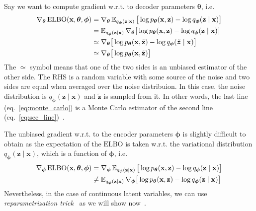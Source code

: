 Say we want to compute gradient w.r.t. to decoder parameters ${\boldsymbol{\theta}}$, i.e. 
\begin{align}
    \nabla_{{\boldsymbol{\theta}}}\,\mathrm{ELBO}(\mathbf{x},{\boldsymbol{\theta}},{\boldsymbol{\phi}}) &= \nabla_{{\boldsymbol{\theta}}} \operatorname{\mathbb{E}}_{q_{\boldsymbol{\phi}}(\mathbf{z}\mid\mathbf{x})} \big[\log p_{\boldsymbol{\theta}}(\mathbf{x},\mathbf{z}) - \log q_{\boldsymbol{\phi}}(\mathbf{z}\mid\mathbf{x})\big] \notag \\
        &= \operatorname{\mathbb{E}}_{q_{\boldsymbol{\phi}}(\mathbf{z}\mid\mathbf{x})} \nabla_{{\boldsymbol{\theta}}} \big[\log p_{\boldsymbol{\theta}}(\mathbf{x},\mathbf{z}) - \log q_{\boldsymbol{\phi}}(\mathbf{z}\mid\mathbf{x})\big] \label{eq:sec_line} \\
        &\simeq  \nabla_{{\boldsymbol{\theta}}} \big[\log p_{\boldsymbol{\theta}}(\mathbf{x},\tilde{\mathbf{z}}) - \log q_{\boldsymbol{\phi}}(\boldsymbol{\tilde{z}}\mid\mathbf{x})\big] \notag\\
        &\simeq \nabla_{{\boldsymbol{\theta}}} \big[\log p_{\boldsymbol{\theta}}(\mathbf{x},\tilde{\mathbf{z}})\big] \label{eq:monte_carlo}
\end{align}
The $\simeq$ symbol means that one of the two sides is an unbiased estimator of the other side. The RHS is a random variable with some source of the noise and two sides are equal
when averaged over the noise distribuion. In this case, the noise distribution is $q_{\boldsymbol{\phi}}(\mathbf{z}\mid \mathbf{x})$ and $\tilde{\mathbf{z}}$ is sampled from it. In other words, the last 
line (eq.~\ref{eq:monte_carlo}) is a Monte Carlo estimator of the second line (eq.~\ref{eq:sec_line})~\cite{intro-vae-2019}.

The unbiased gradient w.r.t. to the encoder parameters ${\boldsymbol{\phi}}$ is slightly difficult to obtain as the expectation of the $\mathrm{ELBO}$ is taken w.r.t. the variational distribution 
$q_{\boldsymbol{\phi}}(\mathbf{z}\mid \mathbf{x})$, which is a function of ${\boldsymbol{\phi}}$, i.e.
\begin{align}
    \nabla_{{\boldsymbol{\phi}}}\,\mathrm{ELBO}(\mathbf{x},{\boldsymbol{\theta}},{\boldsymbol{\phi}}) &= \nabla_{{\boldsymbol{\phi}}} \operatorname{\mathbb{E}}_{q_{\boldsymbol{\phi}}(\mathbf{z}\mid \mathbf{x})} \big[\log p_{\boldsymbol{\theta}}(\mathbf{x},\mathbf{z}) - \log q_{\boldsymbol{\phi}}(\mathbf{z}\mid \mathbf{x})\big] \\
                                                         &\neq  \operatorname{\mathbb{E}}_{q_{\boldsymbol{\phi}}(\mathbf{z}\mid \mathbf{x})} \nabla_{{\boldsymbol{\phi}}} \big[\log p_{\boldsymbol{\theta}}(\mathbf{x},\mathbf{z}) - \log q_{\boldsymbol{\phi}}(\mathbf{z}\mid \mathbf{x})\big]
\end{align}
Nevertheless, in the case of continuous latent variables, we can use \textit{reparametrization trick}~\cite{renedze-backprop-2014} as we will show now~\cite{intro-vae-2019}.

